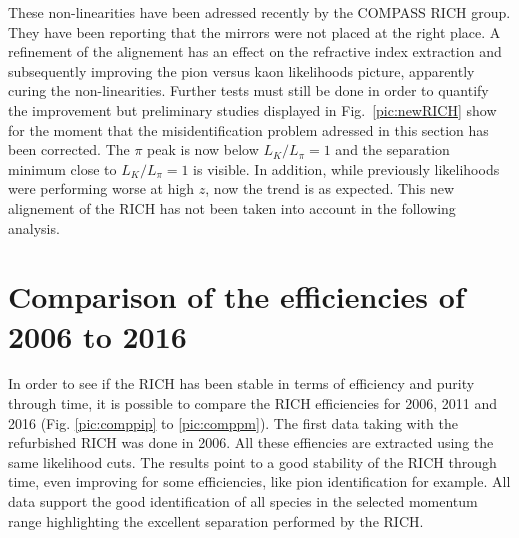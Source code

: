 These non-linearities have been adressed recently by the COMPASS RICH group. They have been reporting that the mirrors were not placed at the right place. A refinement of the alignement has an effect on the refractive index extraction and subsequently improving the pion versus kaon likelihoods picture, apparently curing the non-linearities. Further tests must still be done in order to quantify the improvement but preliminary studies \cite{MarcinNew} displayed in Fig.~\ref{pic:newRICH} show for the moment that the misidentification problem adressed in this section has been corrected. The $\pi$ peak is now below $L_{K}/L_{\pi} = 1$ and the separation minimum close to $L_{K}/L_{\pi} = 1$ is visible. In addition, while previously likelihoods were performing worse at high $z$, now the trend is as expected. This new alignement of the RICH has not been taken into account in the following analysis.

\section{Comparison of the efficiencies of 2006 to 2016}

In order to see if the RICH has been stable in terms of efficiency and purity through time, it is possible to compare the RICH efficiencies for 2006, 2011 and 2016 (Fig. \ref{pic:comppip} to \ref{pic:comppm}). The first data taking with the refurbished RICH was done in 2006. All these effiencies are extracted using the same likelihood cuts. The results point to a good stability of the RICH through time, even improving for some efficiencies, like pion identification for example. All data support the good identification of all species in the selected momentum range highlighting the excellent separation performed by the RICH.

